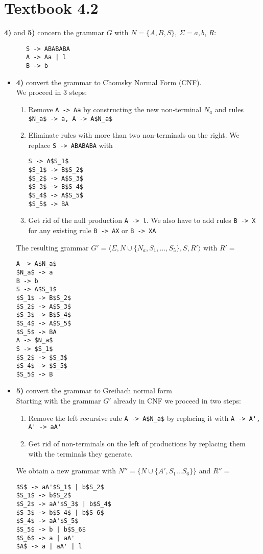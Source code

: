 \documentclass[defaultpackages]{simplereport}
\begin{document}
  \section*{Textbook 4.2}
  \textbf{4)} and \textbf{5)} concern the grammar $G$ with $N = \{A, B, S\}$,
  $\Sigma = {a, b}$, $R:$
    \begin{lstlisting}
      S -> ABABABA
      A -> Aa | l
      B -> b
      \end{lstlisting}
  \begin{itemize}[label=]
  \item \textbf{4)} convert the grammar to Chomsky Normal Form (CNF).\\
    We proceed in 3 steps:
    \begin{enumerate}
      \item Remove \lstinline{A -> Aa} by constructing the new non-terminal
        $N_a$ and rules \lstinline{$N_a$ -> a, A -> A$N_a$}
      \item Eliminate rules with more than two non-terminals on the right. We
        replace \lstinline{S -> ABABABA} with
        \begin{lstlisting}
S -> A$S_1$
$S_1$ -> B$S_2$
$S_2$ -> A$S_3$
$S_3$ -> B$S_4$
$S_4$ -> A$S_5$
$S_5$ -> BA
        \end{lstlisting}
      \item Get rid of the null production \lstinline{A -> l}. We also have to
        add rules \lstinline{B -> X} for any existing rule \lstinline{B -> AX}
        or \lstinline{B -> XA}
      \end{enumerate}
      The resulting grammar $G' = \langle \Sigma, N \cup \{N_a, S_{1}, ... ,
      S_5\}, S, R' \rangle$ with $R' = $
      \begin{lstlisting}
A -> A$N_a$
$N_a$ -> a
B -> b
S -> A$S_1$
$S_1$ -> B$S_2$
$S_2$ -> A$S_3$
$S_3$ -> B$S_4$
$S_4$ -> A$S_5$
$S_5$ -> BA
A -> $N_a$
S -> $S_1$
$S_2$ -> $S_3$
$S_4$ -> $S_5$
$S_5$ -> B
\end{lstlisting}

    \item \textbf{5)} convert the grammar to Greibach normal form\\
      Starting with the grammar $G'$ already in CNF we proceed in two steps:
      \begin{enumerate}
        \item Remove the left recursive rule \lstinline{A -> A$N_a$} by
          replacing it with \lstinline{A -> A', A' -> aA'}
        \item Get rid of non-terminals on the left of productions by replacing
          them with the terminals they generate.
        \end{enumerate}
     We obtain a new grammar with $N'' = \{N \cup \{A', S_1 ... S_6\}\}$ and
     $R'' =$
     \begin{lstlisting}
$S$ -> aA'$S_1$ | b$S_2$
$S_1$ -> b$S_2$
$S_2$ -> aA'$S_3$ | b$S_4$
$S_3$ -> b$S_4$ | b$S_6$
$S_4$ -> aA'$S_5$
$S_5$ -> b | b$S_6$
$S_6$ -> a | aA'
$A$ -> a | aA' | l
\end{lstlisting}


\end{itemize}
\end{document}
